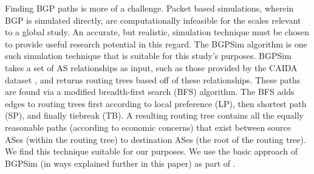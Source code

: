 \par Finding BGP paths is more of
a challenge.
Packet based simulations, wherein BGP is simulated
directly, are computationally infeasible for the scales relevant to a
global study. An accurate, but realistic, simulation technique must be
chosen to provide useful research potential in this regard.  The
BGPSim algorithm \cite{quicksand} is one such simulation technique
that is suitable for this study's purposes. BGPSim takes a set of AS
relationships as input, such as those provided by the CAIDA dataset
\cite{CAIDA}, and returns routing trees based off of these
relationships. These paths are found via a modified breadth-first
search (BFS) algorithm. The BFS adds edges to routing trees first
according to local preference (LP), then shortest path (SP), and
finally tiebreak (TB).  A resulting routing tree contains all the
equally reasonable paths (according to economic concerns) that exist
between source ASes (within the routing tree) to destination ASes (the
root of the routing tree). We find this technique suitable  for our
purposes. We use the basic approach of BGPSim (in ways explained further in this
paper) as part of \toolname{}.

